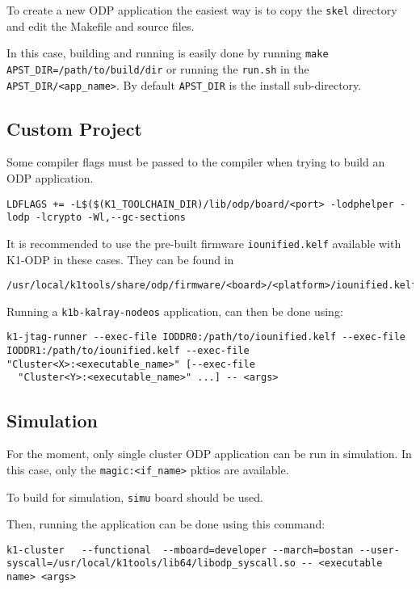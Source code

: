 \documentclass{trkalray}
\begin{document}
To create a new ODP application the easiest way is to copy the
\texttt{skel} directory and edit the Makefile and source files.

In this case, building and running is easily done by running
\texttt{make APST\_DIR=/path/to/build/dir} or running the
\texttt{run.sh} in the \texttt{APST\_DIR/<app\_name>}.
By default \texttt{APST\_DIR} is the install sub-directory.


\subsection{Custom Project}

Some compiler flags must be passed to the compiler when trying to
build an ODP application.
\begin{lstlisting}
LDFLAGS += -L$($(K1_TOOLCHAIN_DIR)/lib/odp/board/<port> -lodphelper -lodp -lcrypto -Wl,--gc-sections
\end{lstlisting}

It is recommended to use the pre-built firmware
\texttt{iounified.kelf} available with K1-ODP in these cases.
They can be found in
\begin{lstlisting}
/usr/local/k1tools/share/odp/firmware/<board>/<platform>/iounified.kelf
\end{lstlisting}

Running a \texttt{k1b-kalray-nodeos} application, can then be done using:
\begin{lstlisting}
k1-jtag-runner --exec-file IODDR0:/path/to/iounified.kelf --exec-file
IODDR1:/path/to/iounified.kelf --exec-file
"Cluster<X>:<executable_name>" [--exec-file
  "Cluster<Y>:<executable_name>" ...] -- <args>
\end{lstlisting}

\subsection{Simulation}

For the moment, only single cluster ODP application can be run in
simulation. In this case, only the \texttt{magic:<if\_name>} pktios
are available.

To build for simulation, \texttt{simu} board should be used.

Then, running the application can be done using this command:
\begin{lstlisting}
k1-cluster   --functional  --mboard=developer --march=bostan --user-syscall=/usr/local/k1tools/lib64/libodp_syscall.so -- <executable name> <args>
\end{lstlisting}
\end{document}
